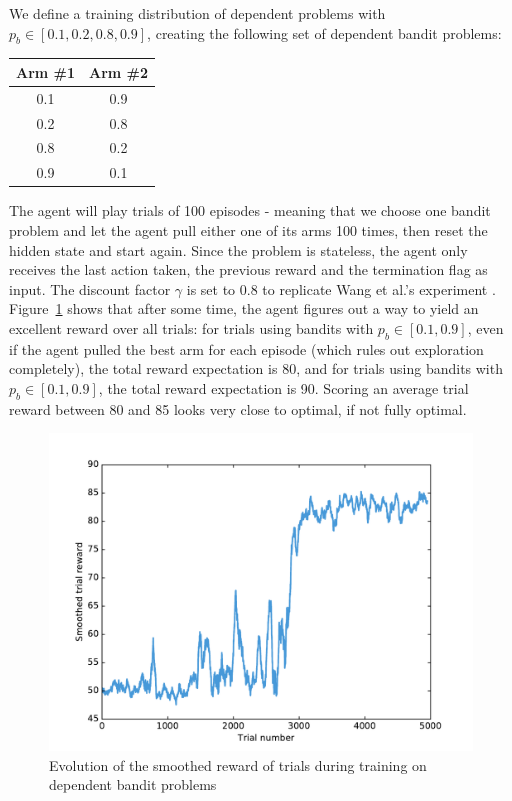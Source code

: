 We define a training distribution of dependent problems with
$p_b \in [0.1, 0.2, 0.8, 0.9]$, creating the following set of dependent
bandit problems:
\begin{table}[H]
	\centering
	\begin{tabular}{c|c}
		Arm \#1 & Arm \#2 \\ \hline
		0.1 & 0.9 \\ \hline
		0.2 & 0.8 \\ \hline
		0.8 & 0.2 \\ \hline
		0.9 & 0.1
	\end{tabular}
\end{table}

The agent will play trials of 100 episodes - meaning that we choose one bandit
problem and let the agent pull either one of its arms 100 times, then reset
the hidden state and start again. Since the problem is stateless, the agent
only receives the last action taken, the previous reward and the termination
flag as input. The discount factor $\gamma$ is set to 0.8 to replicate 
Wang et al.'s experiment \cite{learningtorl}.\\

Figure~\ref{fig:bandit_reward} shows that after some time, the agent figures out
a way to yield an excellent reward over all trials: for trials using bandits
with $p_b \in [0.1, 0.9]$, even if the agent pulled the best arm for
each episode (which rules out exploration completely), the total reward
expectation is 80, and for trials using bandits with $p_b \in [0.1, 0.9]$, 
the total reward expectation is 90. Scoring an average trial reward between
80 and 85 looks very close to optimal, if not fully optimal.\\

\begin{figure}
	\centering
	\includegraphics[width=0.8\linewidth]{fig/bandit_reward.pdf}
	\caption{Evolution of the smoothed reward of trials during training on
	dependent bandit problems}
	\label{fig:bandit_reward}
\end{figure}


